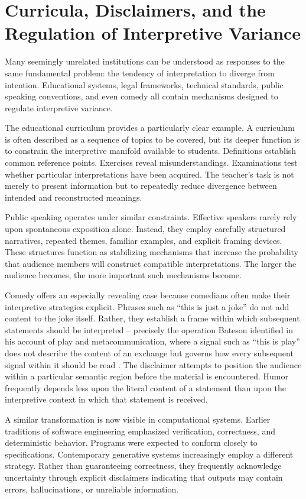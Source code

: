 \documentclass[11pt]{article}
\theoremstyle{plain}
\begin{document}
\section{Curricula, Disclaimers, and the Regulation of Interpretive Variance}

Many seemingly unrelated institutions can be understood as responses to the same fundamental problem: the tendency of interpretation to diverge from intention. Educational systems, legal frameworks, technical standards, public speaking conventions, and even comedy all contain mechanisms designed to regulate interpretive variance.

The educational curriculum provides a particularly clear example. A curriculum is often described as a sequence of topics to be covered, but its deeper function is to constrain the interpretive manifold available to students. Definitions establish common reference points. Exercises reveal misunderstandings. Examinations test whether particular interpretations have been acquired. The teacher's task is not merely to present information but to repeatedly reduce divergence between intended and reconstructed meanings.

Public speaking operates under similar constraints. Effective speakers rarely rely upon spontaneous exposition alone. Instead, they employ carefully structured narratives, repeated themes, familiar examples, and explicit framing devices. These structures function as stabilizing mechanisms that increase the probability that audience members will construct compatible interpretations. The larger the audience becomes, the more important such mechanisms become.

Comedy offers an especially revealing case because comedians often make their interpretive strategies explicit. Phrases such as ``this is just a joke'' do not add content to the joke itself. Rather, they establish a frame within which subsequent statements should be interpreted -- precisely the operation Bateson identified in his account of play and metacommunication, where a signal such as ``this is play'' does not describe the content of an exchange but governs how every subsequent signal within it should be read \cite{bateson1972}. The disclaimer attempts to position the audience within a particular semantic region before the material is encountered. Humor frequently depends less upon the literal content of a statement than upon the interpretive context in which that statement is received.

A similar transformation is now visible in computational systems. Earlier traditions of software engineering emphasized verification, correctness, and deterministic behavior. Programs were expected to conform closely to specifications. Contemporary generative systems increasingly employ a different strategy. Rather than guaranteeing correctness, they frequently acknowledge uncertainty through explicit disclaimers indicating that outputs may contain errors, hallucinations, or unreliable information.
\end{document}
